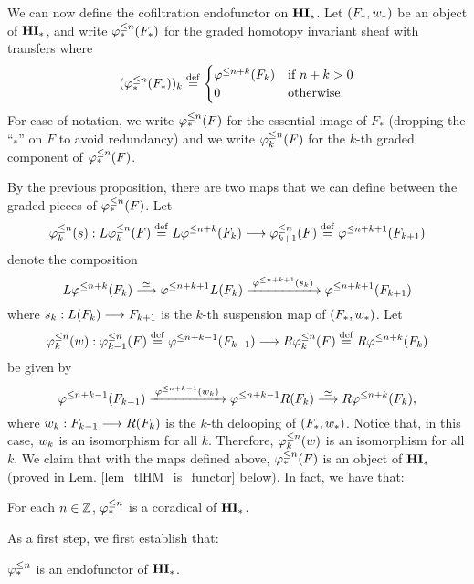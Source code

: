 We can now define the cofiltration endofunctor on $\HM$. Let
$(F_*, \deloop_*)$ be an object of $\HM$, and write $\tlHM{n}(F_*)$ 
for the graded homotopy invariant sheaf with transfers where
\[
(\tlHM{n}(F_*))_k \defeq
\begin{cases}
   \tlHI{n + k}(F_k) & \textrm{if } n + k > 0 \\
   0                 & \textrm{otherwise}.
\end{cases}
\]
For ease of notation, we write $\tlHM{n}(F)$ for the essential 
image of $F_*$ (dropping the ``$_*$'' on $F$ to avoid 
redundancy) and we write $\tlHM[k]{n}(F)$ for the $k$-th graded 
component of $\tlHM{n}(F)$.

By the previous proposition, there are two maps that we can
define between the graded pieces of $\tlHM{n}(F)$. Let
\[
\suspTL[k]{n} : L\tlHM[k]{n}(F) \defeq 
   L \tlHI{n + k}(F_k) \to \tlHM[k + 1]{n}(F) \defeq 
   \tlHI{n + k + 1}(F_{k + 1})
\]
denote the composition
\begin{equation}\label{eq_susp_def}
L \tlHI{n + k}(F_k) \stackrel{\simeq}{\to} 
   \tlHI{n + k + 1}L(F_k) 
   \xrightarrow{\;\tlHI{n + k + 1}(\susp_k)\;} 
   \tlHI{n + k + 1}(F_{k + 1})
\end{equation}
where $\susp_k: L(F_k) \to F_{k + 1}$ is the $k$-th suspension 
map of $(F_*, \deloop_*)$. Let
\[
\deloopTL[k]{n} : \tlHM[k - 1]{n}(F) \defeq 
   \tlHI{n + k - 1}(F_{k - 1}) \to R \tlHM[k]{n}(F) \defeq 
   R \tlHI{n + k}(F_{k}) 
\]
be given by
\begin{equation}\label{eq_deloop_def}
\tlHI{n + k - 1}(F_{k - 1})
   \xrightarrow{\;\tlHI{n + k - 1}(\deloop_k)\;} 
   \tlHI{n + k - 1} R(F_k) \stackrel{\simeq}{\to} 
   R \tlHI{n + k}(F_k),
\end{equation}
where $\deloop_k: F_{k - 1} \to R(F_k)$ is the $k$-th delooping
of $(F_*, \deloop_*)$. Notice that, in this case, $\deloop_k$ is
an isomorphism for all $k$. Therefore, $\deloopTL[k]{n}$ is an 
isomorphism for all $k$. We claim that with the maps defined above,
$\tlHM{n}(F)$ is an object of $\HM$ (proved in Lem. 
\ref{lem_tlHM_is_functor} below). In fact, we have that:

\begin{thm}\label{thm_tlHM_corad}
For each $n \in \Z$, $\tlHM{n}$ is a coradical of $\HM$.
\end{thm}

As a first step, we first establish that:

\begin{lem}\label{lem_tlHM_is_functor}
$\tlHM{n}$ is an endofunctor of $\HM$.
\end{lem}

